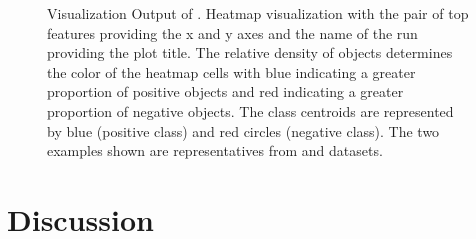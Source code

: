 \begin{figure}[h]
\vspace{-5mm}
\centering %
{}
\vspace{-5mm}
\caption{Visualization Output of \genviz. Heatmap visualization with the pair of top features providing the x and y axes and the name of the run providing the plot title. The relative density of objects determines the color of the heatmap cells with blue indicating a greater proportion of positive objects and red indicating a greater proportion of negative objects. The class centroids are represented by blue (positive class) and red circles (negative class). The two examples shown are representatives from \msig and \lincs datasets. }
\vspace{-5mm}
\label{fig:viz}
\end{figure}

\section{Discussion}\label{sec:disc}

